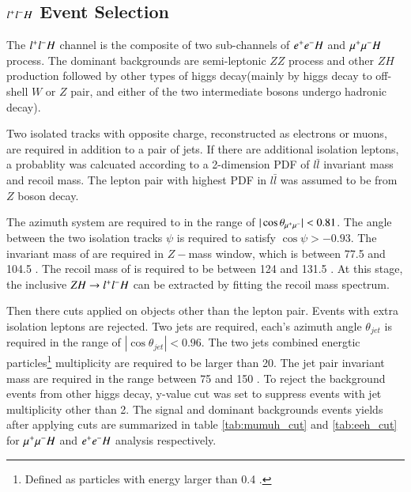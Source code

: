 \subsection{$l^{+}l^{-}H$ Event Selection}\label{subsec:selection}
The $l^{+}l^{-}H$ channel is the composite of two sub-channels of $e^{+}e^{-}H$ and $\mu^{+}\mu^{-}H$ process. The dominant backgrounds are semi-leptonic $ZZ$ process and other $ZH$ production followed by other types of higgs decay(mainly by higgs decay to off-shell $W$ or $Z$ pair, and either of the two intermediate bosons undergo hadronic decay).\par
Two isolated tracks with opposite charge, reconstructed as electrons or muons, are required in addition to a pair of jets. If there are additional isolation leptons, a probablity was calcuated according to a 2-dimension 
PDF of $l\bar{l}$ invariant mass and recoil mass. 
The lepton pair with highest PDF in $l\bar{l}$ was assumed to be from $Z$ boson decay. \par
The azimuth \mupair system are required to in the range of $|\cos\theta_{\mu^{+}\mu^{-}}| < 0.81$. The 
angle between the two isolation tracks $\psi$ is required to satisfy $\cos\psi > -0.93$. 
The invariant mass of \mupair are required in $Z-$mass window, which is between 77.5 \GeV and 104.5 \GeV. The recoil mass of \mupair is required to be between 124 \GeV and 131.5 \GeV.
At this stage, the inclusive $ZH\rightarrow l^{+}l^{-}H$ can be extracted by fitting the recoil mass spectrum.\par
Then there cuts applied on objects other than the lepton pair. 
Events with extra isolation leptons are rejected. 
Two jets are required, each's azimuth angle $\theta_{jet}$ is required in 
the range of $|\cos\theta_{jet}| < 0.96$. 
The two jets combined energtic particles\footnote{Defined as particles with energy larger than 0.4 \GeV.} multiplicity are required to be larger than 20.
The jet pair invariant mass are required in the range between 75 \GeV and 150 \GeV. 
To reject the background events from other higgs decay, y-value cut was set to suppress events with jet multiplicity other than 2. The signal and dominant backgrounds events yields after applying cuts are summarized in table \ref{tab:mumuh_cut} and \ref{tab:eeh_cut} for $\mu^{+}\mu^{-}H$ and $e^{+}e^{-}H$ analysis respectively.\par


